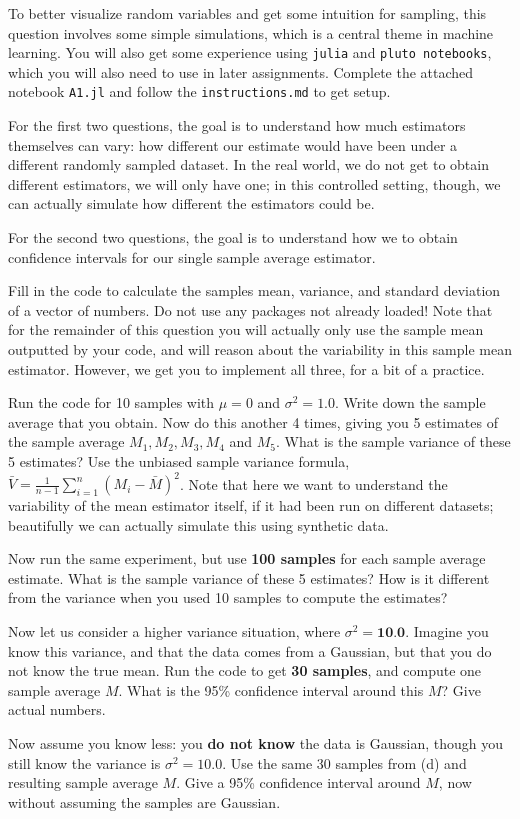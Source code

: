 

To better visualize random variables and get some intuition for
sampling, this question involves some simple simulations, which is a
central theme in machine learning. You will also get some experience
using \verb+julia+ and \verb+pluto notebooks+, which you will also
need to use in later assignments. Complete the attached notebook
\verb+A1.jl+ and follow the \verb+instructions.md+ to get setup.


For the first two questions, the goal is to understand how much estimators themselves can vary: how different our estimate
would have been under a different randomly sampled dataset. In the real world, we do not get to obtain different estimators, we will only have one; in this controlled setting, though, we can actually simulate how different the estimators could be. 

For the second two questions, the goal is to understand how we to obtain confidence intervals for our single sample average estimator. 

Fill in the code to calculate the samples mean, variance, and standard deviation
of a vector of numbers. Do not use any packages not already loaded!
Note that for the remainder of this question you will actually only use the sample mean outputted by your code, and will reason about the variability in this sample mean estimator. However, we get you to implement all three, for a bit of a practice. 

Run the code for 10 samples with $\mu=0$ and $\sigma^2 = 1.0$. Write down the sample average that you obtain. 
Now do this another 4 times, giving you 5 estimates of the sample average $M_1, M_2, M_3, M_4$ and $M_5$. 
What is the sample variance of these 5 estimates? Use the unbiased sample variance formula, $\bar{V} = \frac{1}{n-1} \sum_{i=1}^n (M_i - \bar{M})^2$. Note that here we want to understand the variability of the mean estimator itself, if it had been run on different datasets; beautifully we can actually simulate this using synthetic data. 

Now run the same experiment, but use \textbf{100 samples} for each sample average estimate. What is the sample variance of these 5 estimates?
How is it different from the variance when you used 10 samples to compute the estimates?

Now let us consider a higher variance situation, where $\sigma^2 = \textbf{10.0}$. Imagine you know this variance, and that the data comes from a Gaussian, but that you do not know the true mean. Run the code to get \textbf{30 samples}, and compute one sample average $M$. What is the 95\% confidence interval around this $M$? Give actual numbers.

Now assume you know less: you \textbf{do not know} the data is Gaussian, though you still know the variance is $\sigma^2 = 10.0$.
Use the same 30 samples from (d) and resulting sample average $M$. Give a 95\% confidence interval around $M$, now without assuming the samples are Gaussian. 